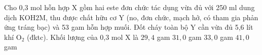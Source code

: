 \begin{ex}[3][][(Đề THPT QG - 2017)]
	Cho 0,3 mol hỗn hợp $\mathrm{X}$ gồm hai este đơn chức tác dụng vừa đủ với 250 $\mathrm{ml}$ dung dịch $\mathrm{KOH} 2 \mathrm{M}$, thu được chất hữu cơ $\mathrm{Y}$ (no, đơn chức, mạch hở, có tham gia phản ứng tráng bạc) và 53 gam hỗn hợp muối. Đốt cháy toàn bộ $\mathrm{Y}$ cần vừa đủ 5,6 lít khí $\mathrm{O}_2$ (đktc). Khối lượng của 0,3 mol X là
	\choice
	{%
		$ 29,4 $ gam
	}
	{%
		$ 31,0 $ gam
	}	
	{%
		\True $ 33,0 $ gam
	}
	{%
		$ 41,0 $ gam
	}
	\sodongkeex[8]
\end{ex}











